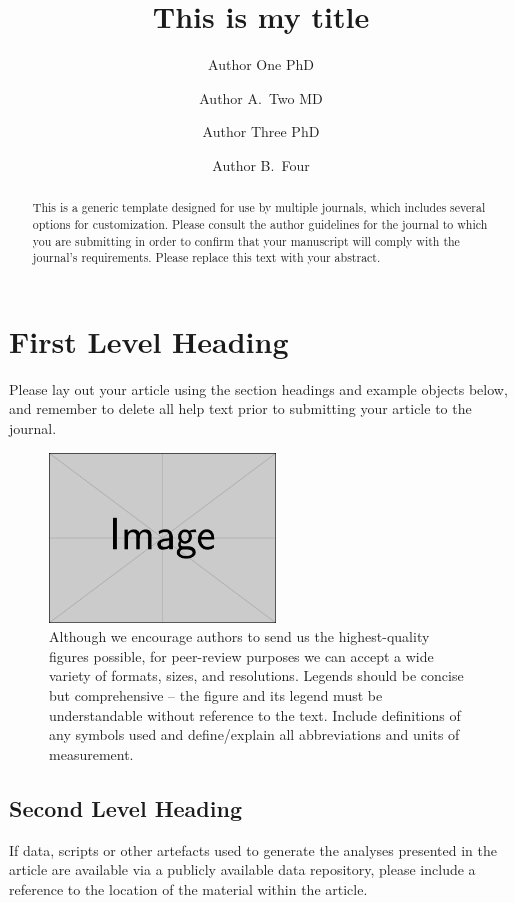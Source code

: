 \documentclass[num-refs]{wiley-article}
\title{This is my title}
\author[1\authfn{1}]{Author One PhD}
\author[2\authfn{1}]{Author A.~Two MD}
\author[2\authfn{2}]{Author Three PhD}
\author[2]{Author B.~Four}
\affil[1]{Department, Institution, City, State or Province, Postal Code, Country}
\affil[2]{Department, Institution, City, State or Province, Postal Code, Country}
\begin{document}
\begin{frontmatter}
\maketitle

\begin{abstract}
This is a generic template designed for use by multiple journals, which includes several options for customization. Please consult the author guidelines for the journal to which you are submitting in order to confirm that your manuscript will comply with the journal's requirements. Please replace this text with your abstract.

\end{abstract}
\end{frontmatter}

\section{First Level Heading}
Please lay out your article using the section headings and example objects below, and remember to delete all help text prior to submitting your article to the journal.

\begin{figure}[bt]
\centering
\includegraphics[width=6cm]{example-image-rectangle}
\caption{Although we encourage authors to send us the highest-quality figures possible, for peer-review purposes we can accept a wide variety of formats, sizes, and resolutions. Legends should be concise but comprehensive -- the figure and its legend must be understandable without reference to the text. Include definitions of any symbols used and define/explain all abbreviations and units of measurement.}
\end{figure}

\subsection{Second Level Heading}
If data, scripts or other artefacts used to generate the analyses presented in the article are available via a publicly available data repository, please include a reference to the location of the material within the article.
\end{document}
